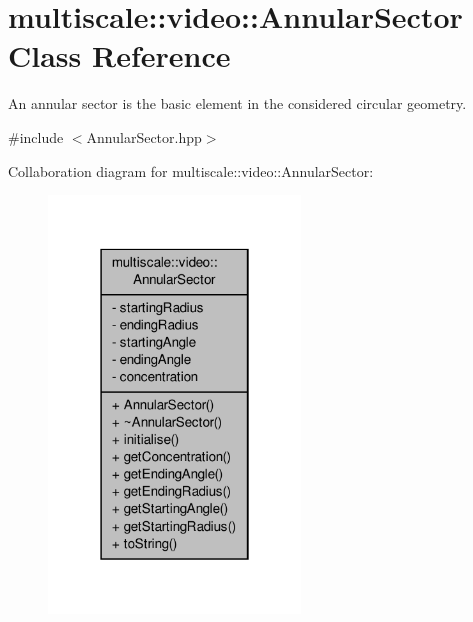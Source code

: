 \hypertarget{classmultiscale_1_1video_1_1AnnularSector}{\section{multiscale\-:\-:video\-:\-:Annular\-Sector Class Reference}
\label{classmultiscale_1_1video_1_1AnnularSector}
}


An annular sector is the basic element in the considered circular geometry.  




{\ttfamily \#include $<$Annular\-Sector.\-hpp$>$}



Collaboration diagram for multiscale\-:\-:video\-:\-:Annular\-Sector\-:
\nopagebreak
\begin{figure}[H]
\begin{center}
\leavevmode
\includegraphics[width=190pt]{classmultiscale_1_1video_1_1AnnularSector__coll__graph}
\end{center}
\end{figure}
